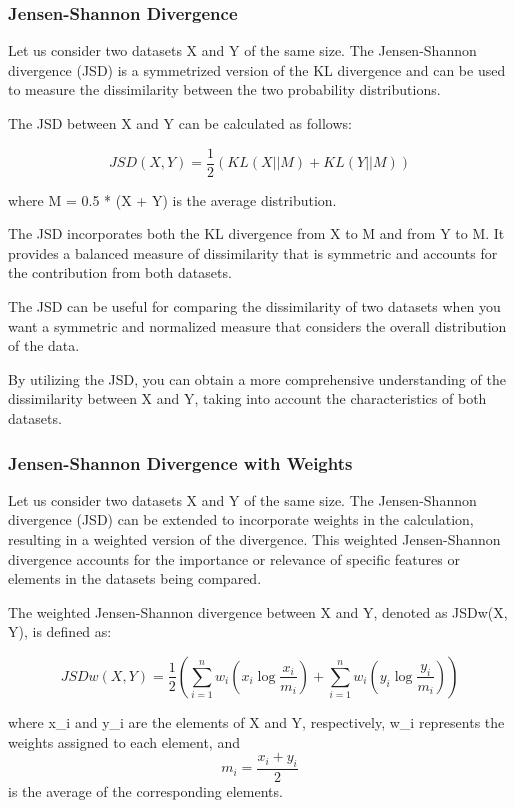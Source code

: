 \subsubsection{Jensen-Shannon Divergence}

Let us consider two datasets X and Y of the same size. The Jensen-Shannon divergence (JSD) is a symmetrized version of the KL divergence and can be used to measure the dissimilarity between the two probability distributions.

The JSD between X and Y can be calculated as follows:

\[JSD(X, Y) = \frac{1}{2} \left( KL(X || M)
  + KL(Y || M) \right)\]

where M = 0.5 * (X + Y) is the average distribution.

The JSD incorporates both the KL divergence from X to M and from Y to M. It provides a balanced measure of dissimilarity that is symmetric and accounts for the contribution from both datasets.

The JSD can be useful for comparing the dissimilarity of two datasets when you want a symmetric and normalized measure that considers the overall distribution of the data.

By utilizing the JSD, you can obtain a more comprehensive understanding of the dissimilarity between X and Y, taking into account the characteristics of both datasets.

\subsubsection{Jensen-Shannon Divergence with Weights}

Let us consider two datasets X and Y of the same size. The Jensen-Shannon divergence (JSD) can be extended to incorporate weights in the calculation, resulting in a weighted version of the divergence. This weighted Jensen-Shannon divergence accounts for the importance or relevance of specific features or elements in the datasets being compared.

The weighted Jensen-Shannon divergence between X and Y, denoted as JSDw(X, Y), is defined as:

\[JSDw(X, Y) = \frac{1}{2} \left( \sum_{i=1}^{n} w_i \left( x_i \log \frac{x_i}{m_i} \right) + \sum_{i=1}^{n} w_i \left( y_i \log \frac{y_i}{m_i} \right) \right)\]

where x\_i and y\_i are the elements of X and Y, respectively, w\_i represents the weights assigned to each element, and \[m_i = \frac{{x_i + y_i}}{2}\] is the average of the corresponding elements.

